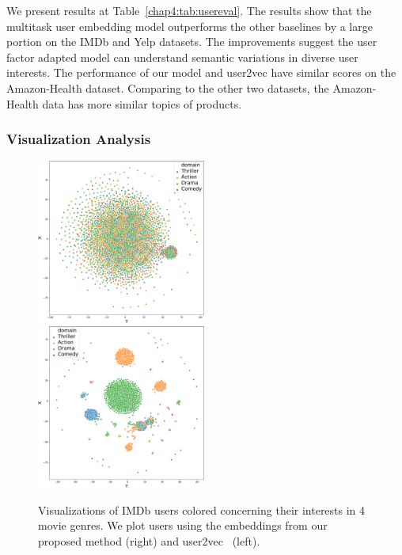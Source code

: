 We present results at Table~\ref{chap4:tab:usereval}.
The results show that the multitask user embedding model outperforms the other baselines by a large portion on the IMDb and Yelp datasets.
The improvements suggest the user factor adapted model can understand semantic variations in diverse user interests.
The performance of our model and user2vec have similar scores on the Amazon-Health dataset.
Comparing to the other two datasets, the Amazon-Health data has more similar topics of products.



\subsubsection{Visualization Analysis}

\begin{figure}[t!]
\centering
\includegraphics[width=0.495\textwidth]{./images/chapter4/uembedding/user2vec_emb_viz.pdf}
\includegraphics[width=0.495\textwidth]{./images/chapter4/uembedding/ours_emb_viz.pdf}
\caption{Visualizations of IMDb users colored concerning their interests in 4 movie genres. We plot users using the embeddings from our proposed method (right) and user2vec~\cite{amir2017quantifying} (left).}
\label{chap4:fig:uemb_viz}
\end{figure}

